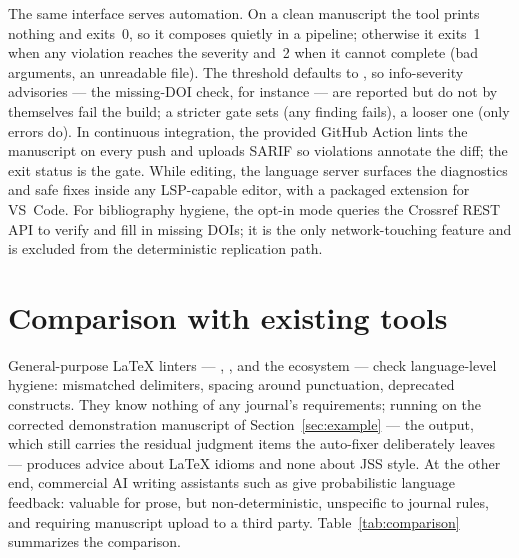 \documentclass[nojss,article]{jss}
\begin{document}
The same interface serves automation. On a clean manuscript the tool
prints nothing and exits~0, so it composes quietly in a pipeline;
otherwise it exits~1 when any violation reaches the 
severity and~2 when it cannot complete (bad arguments, an unreadable
file). The  threshold defaults to , so
info-severity advisories --- the missing-DOI check, for instance ---
are reported but do not by themselves fail the build; a stricter gate
sets  (any finding fails), a looser one
 (only errors do). In
continuous integration, the provided GitHub Action lints the
manuscript on every push and uploads SARIF so violations annotate the
diff; the exit status is the gate. While editing, the language server
surfaces the diagnostics
and safe fixes inside any LSP-capable editor, with a packaged
extension for VS~Code. For bibliography hygiene, the opt-in
 mode queries the Crossref REST API
\citep{crossrefapi} to verify and fill in missing DOIs; it is the
only network-touching feature and is excluded from the deterministic
replication path.

\section{Comparison with existing tools}
\label{sec:comparison}

General-purpose \LaTeX{} linters ---  \citep{chktex},
 \citep{lacheck}, and the  ecosystem
\citep{texlint_js} --- check language-level hygiene: mismatched
delimiters, spacing around punctuation, deprecated constructs. They
know nothing of any journal's requirements; running  on
the corrected demonstration manuscript of Section~\ref{sec:example}
--- the  output, which still carries the residual
judgment items the auto-fixer deliberately leaves --- produces advice
about \LaTeX{} idioms and none about JSS style. At the other end, commercial AI writing
assistants such as  \citep{writefull} give
probabilistic language feedback: valuable for prose, but
non-deterministic, unspecific to journal rules, and requiring
manuscript upload to a third party. Table~\ref{tab:comparison}
summarizes the comparison.
\end{document}
